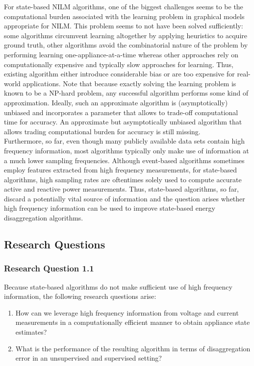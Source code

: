\documentclass[11pt]{cmuthesis} %
\begin{document}
For state-based NILM algorithms, one of the biggest challenges seems to be the computational burden associated with the learning problem in graphical models appropriate for NILM. This problem seems to not have been solved sufficiently: some algorithms circumvent learning altogether by applying heuristics to acquire ground truth, other algorithms avoid the combinatorial nature of the problem by performing learning one-appliance-at-a-time whereas other approaches rely on computationally expensive and typically slow approaches for learning. Thus, existing algorithm either introduce considerable bias or are too expensive for real-world applications. Note that because exactly solving the learning problem is known to be a NP-hard problem, any successful algorithm performs some kind of approximation. Ideally, such an approximate algorithm is (asymptotically) unbiased and incorporates a parameter that allows to trade-off computational time for accuracy. An approximate but asymptotically unbiased algorithm that allows trading computational burden for accuracy is still missing.\\
Furthermore, so far, even though many publicly available data sets contain high frequency information, most algorithms typically only make use of information at a much lower sampling frequencies. Although event-based algorithms sometimes employ features extracted from high frequency measurements, for state-based algorithms, high sampling rates are oftentimes solely used to compute accurate active and reactive power measurements. Thus, state-based algorithms, so far, discard a potentially vital source of information and the question arises whether high frequency information can be used to improve state-based energy disaggregation algorithms.

\newpage
\subsection{Research Questions}
\subsubsection{Research Question 1.1}

Because state-based algorithms do not make sufficient use of high frequency information, the following research questions arise:

\begin{enumerate}
\item How can we leverage high frequency information from voltage and current measurements in a computationally efficient manner to obtain appliance state estimates?
\item What is the performance of the resulting algorithm in terms of disaggregation error in an unsupervised and supervised setting?
\end{enumerate}
\end{document}
